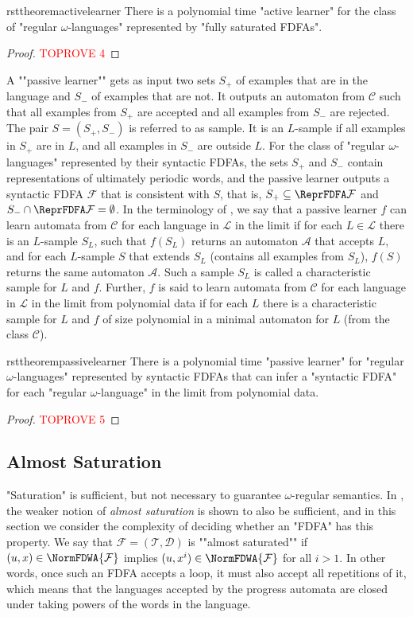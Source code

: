 \documentclass[a4paper,USenglish,cleveref,autoref,thm-restate]{lipics-v2021}
\newcommand{\mc}[1]{\ensuremath{\mathcal{#1}}}
\newcommand{\A}{\mc{A}}
\newcommand{\T}{\mc{T}}
\newcommand{\F}{\mc{F}}
\newcommand{\D}{\mc{D}}
\newcommand{\C}{\mc{C}}
\renewcommand{\L}{\mc{L}}
\begin{document}
\begin{restatable}{rsttheorem}{activelearner}
There is a polynomial time "active learner" for the class of "regular $\omega$-languages" represented by "fully saturated FDFAs".
\label{theorem:activelearner}
\end{restatable}
\begin{proof}\textcolor{red}{TOPROVE 4}\end{proof}

A ""passive learner"" gets as input two sets $S_+$ of examples that are in the language and $S_-$ of examples that are not. It outputs an automaton from $\C$ such that all examples from $S_+$ are accepted and all examples from $S_-$ are rejected. The pair $S = (S_+,S_-)$ is referred to as sample. It is an $L$-sample if all examples in $S_+$ are in $L$, and all examples in $S_-$ are outside $L$. For the class of "regular $\omega$-languages" represented by their syntactic FDFAs, the sets $S_+$ and $S_-$ contain representations of ultimately periodic words, and the passive learner outputs a syntactic FDFA $\F$ that is consistent with $S$, that is, $S_+ \subseteq \ReprFDFA\F$ and $S_- \cap \ReprFDFA\F = \emptyset$.
In the terminology of \cite{Gold78}, we say that a passive learner $f$ can learn automata from $\C$ for each language in $\L$ in the limit if for each $L \in \L$ there is an $L$-sample $S_L$, such that $f(S_L)$ returns an automaton $\A$ that accepts $L$, and for each $L$-sample $S$ that extends $S_L$ (contains all examples from $S_L$), $f(S)$ returns the same automaton $\A$. Such a sample $S_L$ is called a characteristic sample for $L$ and $f$. Further, $f$ is said to learn automata from $\C$ for each language in $\L$ in the limit from polynomial data if for each $L$ there is a characteristic sample for $L$ and $f$ of size polynomial in a minimal automaton for $L$ (from the class $\C$).

\begin{restatable}{rsttheorem}{passivelearner}
There is a polynomial time "passive learner" for "regular $\omega$-languages" represented by syntactic FDFAs that can infer a "syntactic FDFA" for each "regular $\omega$-language" in the limit from polynomial data.
\label{theorem:passivelearner}
\end{restatable}
\begin{proof}\textcolor{red}{TOPROVE 5}\end{proof}
 \subsection{Almost Saturation}\label{section:almostsaturation}
"Saturation" is sufficient, but not necessary to guarantee $\omega$-regular semantics.
In \cite{LiST23}, the weaker notion of \emph{almost saturation} is shown to also be sufficient, and in this section we consider the complexity of deciding whether an "FDFA" has this property.
\AP
We say that $\F = (\T, \D)$ is ""almost saturated"" if $(u,x) \in \NormFDWA{\F}$ implies $(u,x^i) \in \NormFDWA{\F}$ for all $i > 1$.
In other words, once such an FDFA accepts a loop, it must also accept all repetitions of it, which means that the languages accepted by the progress automata are closed under taking powers of the words in the language.
\end{document}
